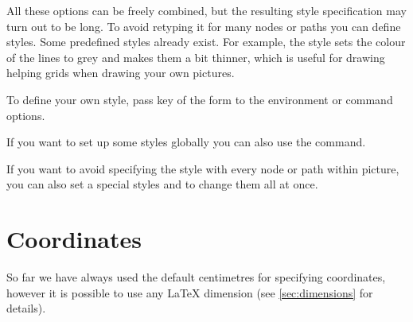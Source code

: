All these options can be freely combined, but the resulting style specification
may turn out to be long. To avoid retyping it for many nodes or paths you can
define styles. Some predefined styles already exist. For example, the
 style sets the colour of the lines to grey and makes them a bit
thinner, which is useful for drawing helping grids when drawing your own
pictures.
\begin{example}
\end{example}
To define your own style, pass key of the form
 to the \TikZ{} environment or
command options.
\begin{example}[vertical_mode, examplewidth=0.7\linewidth]
\end{example}
If you want to set up some styles globally you can also use the 
command.
\begin{example}
\end{example}
If you want to avoid specifying the style with every node or path within
\TikZ{} picture, you can also set a special styles  and
 to change them all at once.
\begin{example}
\end{example}

\section{Coordinates}

So far we have always used the default centimetres for specifying coordinates,
however it is possible to use any \LaTeX{} dimension (see
\autoref{sec:dimensions} for details).
\begin{example}
\end{example}

